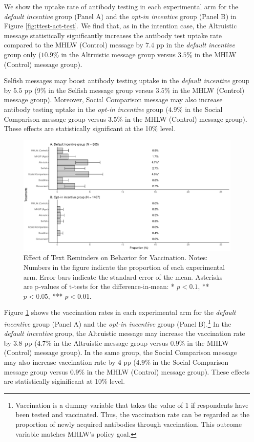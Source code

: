 \documentclass[
]{article}
\begin{document}
We show the uptake rate of antibody testing in each experimental arm for the \emph{default incentive} group (Panel A) and the \emph{opt-in incentive} group (Panel B) in Figure \ref{fig:ttest-act-test}. We find that, as in the intention case, the Altruistic message statistically significantly increases the antibody test uptake rate compared to the MHLW (Control) message by \(7.4\) pp in the \emph{default incentive} group only (\(10.9\)\% in the Altruistic message group versus \(3.5\)\% in the MHLW (Control) message group).

Selfish messages may boost antibody testing uptake in the \emph{default incentive} group by \(5.5\) pp (9\% in the Selfish message group versus \(3.5\)\% in the MHLW (Control) message group). Moreover, Social Comparison message may also increase antibody testing uptake in the \emph{opt-in incentive} group (\(4.9\)\% in the Social Comparison message group versus \(3.5\)\% in the MHLW (Control) message group). These effects are statistically significant at the 10\% level.

\begin{figure}[t]
\includegraphics{discussion-paper_files/figure-latex/ttest-act-vacc-1} \caption{Effect of Text Reminders on Behavior for Vaccination. Notes: Numbers in the figure indicate the proportion of each experimental arm. Error bars indicate the standard error of the mean. Asterisks are p-values of t-tests for the difference-in-mean: * $p < 0.1$, ** $p < 0.05$, *** $p < 0.01$.}\label{fig:ttest-act-vacc}
\end{figure}

Figure \ref{fig:ttest-act-vacc} shows the vaccination rates in each experimental arm for the \emph{default incentive} group (Panel A) and the \emph{opt-in incentive} group (Panel B).\footnote{Vaccination is a dummy variable that takes the value of 1 if respondents have been tested and vaccinated. Thus, the vaccination rate can be regarded as the proportion of newly acquired antibodies through vaccination. This outcome variable matches MHLW's policy goal.} In the \emph{default incentive} group, the Altruistic message may increase the vaccination rate by \(3.8\) pp (\(4.7\)\% in the Altruistic message group versus \(0.9\)\% in the MHLW (Control) message group). In the same group, the Social Comparison message may also increase vaccination rate by 4 pp (\(4.9\)\% in the Social Comparison message group versus \(0.9\)\% in the MHLW (Control) message group). These effects are statistically siginificant at 10\% level.
\end{document}
